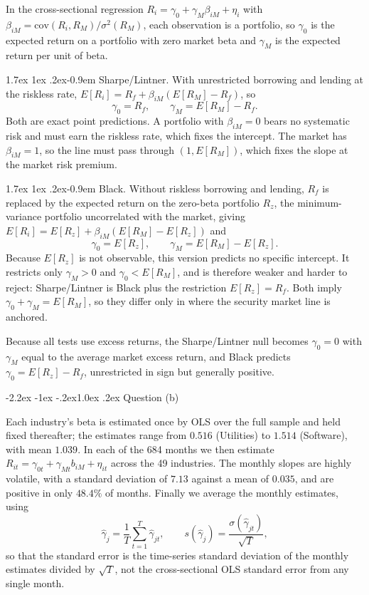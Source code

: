 \documentclass[11pt]{article}
\makeatletter
\renewcommand\subsection{\@startsection{subsection}{2}{0pt}%
  {-2.2ex \@plus -1ex \@minus -.2ex}{1.0ex \@plus .2ex}%
  {\normalfont\bfseries\normalsize\color{psink}}}
\renewcommand\paragraph{\@startsection{paragraph}{4}{0pt}%
  {1.7ex \@plus 1ex \@minus .2ex}{-0.9em}%
  {\normalfont\bfseries\normalsize\color{psink}}}
\makeatother
\begin{document}
In the cross-sectional regression
$R_i = \gamma_0 + \gamma_M \beta_{iM} + \eta_i$ with
$\beta_{iM} = \mathrm{cov}(R_i, R_M)/\sigma^2(R_M)$, each observation is a
portfolio, so $\gamma_0$ is the expected return on a portfolio with zero market
beta and $\gamma_M$ is the expected return per unit of beta.

\paragraph{Sharpe\slash Lintner.} With unrestricted borrowing and lending at
the riskless rate, $E[R_i] = R_f + \beta_{iM}(E[R_M] - R_f)$, so
\[
\gamma_0 = R_f, \qquad \gamma_M = E[R_M] - R_f .
\]
Both are exact point predictions. A portfolio with $\beta_{iM} = 0$ bears no
systematic risk and must earn the riskless rate, which fixes the intercept. The
market has $\beta_{iM} = 1$, so the line must pass through $(1, E[R_M])$, which
fixes the slope at the market risk premium.

\paragraph{Black.} Without riskless borrowing and lending, $R_f$ is replaced by
the expected return on the zero-beta portfolio $R_z$, the minimum-variance
portfolio uncorrelated with the market, giving
$E[R_i] = E[R_z] + \beta_{iM}(E[R_M] - E[R_z])$ and
\[
\gamma_0 = E[R_z], \qquad \gamma_M = E[R_M] - E[R_z] .
\]
Because $E[R_z]$ is not observable, this version predicts no specific
intercept. It restricts only $\gamma_M > 0$ and $\gamma_0 < E[R_M]$, and is
therefore weaker and harder to reject: Sharpe\slash Lintner is Black plus the
restriction $E[R_z] = R_f$. Both imply $\gamma_0 + \gamma_M = E[R_M]$, so they
differ only in where the security market line is anchored.

Because all tests use excess returns, the Sharpe\slash Lintner null becomes
$\gamma_0 = 0$ with $\gamma_M$ equal to the average market excess return, and
Black predicts $\gamma_0 = E[R_z] - R_f$, unrestricted in sign but generally
positive.

\subsection{Question (b)}

Each industry's beta is estimated once by OLS over the full sample and held
fixed thereafter; the estimates range from $0.516$ (Utilities) to $1.514$
(Software), with mean $1.039$. In each of the 684 months we then estimate
$R_{it} = \gamma_{0t} + \gamma_{Mt} b_{iM} + \eta_{it}$ across the 49
industries. The monthly slopes are highly volatile, with a standard deviation
of $7.13$ against a mean of $0.035$, and are positive in only $48.4\%$ of
months. Finally we average the monthly estimates, using
\[
\hat\gamma_j = \frac{1}{T}\sum_{t=1}^{T}\hat\gamma_{jt},
\qquad
s(\hat\gamma_j) = \frac{\sigma(\hat\gamma_{jt})}{\sqrt{T}},
\]
so that the standard error is the time-series standard deviation of the monthly
estimates divided by $\sqrt{T}$, not the cross-sectional OLS standard error
from any single month.
\end{document}
